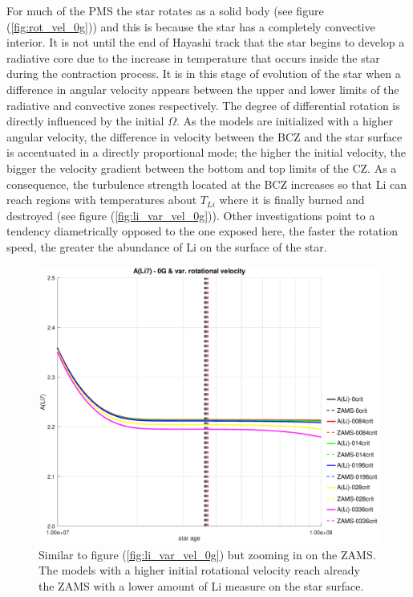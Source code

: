 \documentclass[fleqn,usenatbib]{mnras}
\begin{document}
For much of the PMS the star rotates as a solid body (see figure (\ref{fig:rot_vel_0g})) and this is because the star has a completely convective interior. It is not until the end of Hayashi track that the star begins to develop a radiative core due to the increase in temperature that occurs inside the star during the contraction process. It is in this stage of evolution of the star when a difference in angular velocity appears between the upper and lower limits of the radiative and convective zones respectively. The degree of differential rotation is directly influenced by the initial $\Omega$. As the models are initialized with a higher angular velocity, the difference in velocity between the BCZ and the star surface is accentuated in a directly proportional mode; the higher the initial velocity, the bigger the velocity gradient between the bottom and top limits of the CZ. As a consequence, the turbulence strength located at the BCZ increases so that Li can reach regions with temperatures about $T_{Li}$ where it is finally burned and destroyed (see figure (\ref{fig:li_var_vel_0g})). Other investigations \citep{Bouvier2018, Baraffe2017}  point to a tendency diametrically opposed to the one exposed here, the faster the rotation speed, the greater the abundance of Li on the surface of the star. \par

\begin{figure}
	\includegraphics[trim = 35mm 15mm 20mm 15mm, clip,width=\columnwidth]{figures/li_var_vel_0_0g_z1.eps}
    \caption {Similar to figure (\ref{fig:li_var_vel_0g}) but zooming in on the ZAMS. The models with a higher initial rotational velocity reach already the ZAMS with a lower amount of Li measure on the star surface.}
    \label{fig:li_var_vel_0g_z1}
\end{figure}
\end{document}
